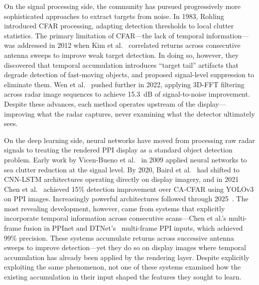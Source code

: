 \documentclass[colorlinks,upint,balance]{asmeconf}
\begin{document}
On the signal processing side, the community has pursued progressively more sophisticated approaches to extract targets from noise. In 1983, Rohling~\cite{Rohling1983CFAR} introduced CFAR processing, adapting detection thresholds to local clutter statistics. The primary limitation of CFAR---the lack of temporal information---was addressed in 2012 when Kim et al.~\cite{Kim2012ScanCorrelation} correlated returns across consecutive antenna sweeps to improve weak target detection. In doing so, however, they discovered that temporal accumulation introduces ``target tail'' artifacts that degrade detection of fast-moving objects, and proposed signal-level suppression to eliminate them. Wen et al.~\cite{Wen2022SpatioTemporal} pushed further in 2022, applying 3D-FFT filtering across radar image sequences to achieve 15.3~dB of signal-to-noise improvement. Despite these advances, each method operates upstream of the display---improving what the radar captures, never examining what the detector ultimately sees.

On the deep learning side, neural networks have moved from processing raw radar signals to treating the rendered PPI display as a standard object detection problem. Early work by Vicen-Bueno et al.~\cite{VicenBueno2009Neural} in 2009 applied neural networks to sea clutter reduction at the signal level. By 2020, Baird et al.~\cite{Baird2020CNNLSTM} had shifted to CNN-LSTM architectures operating directly on display imagery, and in 2021 Chen et al.~\cite{Chen2021PPInet} achieved 15\% detection improvement over CA-CFAR using YOLOv3 on PPI images. Increasingly powerful architectures followed through 2025~\cite{Wang2023SALALSTM, Yin2023SWFormer, Jia2025YOLOv11OBB}. The most revealing development, however, came from systems that explicitly incorporate temporal information across consecutive scans---Chen et al.'s multi-frame fusion in PPInet and DTNet's~\cite{DTNet2025MultiFrame} multi-frame PPI inputs, which achieved 99\% precision. These systems accumulate returns across successive antenna sweeps to improve detection---yet they do so on display images where temporal accumulation has already been applied by the rendering layer. Despite explicitly exploiting the same phenomenon, not one of these systems examined how the existing accumulation in their input shaped the features they sought to learn.
\end{document}
